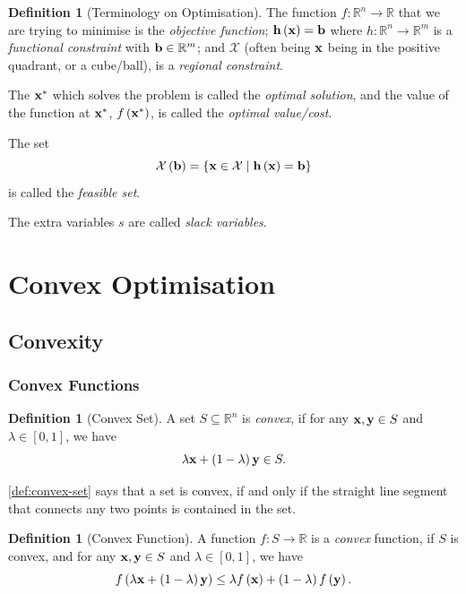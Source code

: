 \documentclass[11pt]{article}
\theoremstyle{definition}
\newtheorem{definition}[theorem]{Definition}
\theoremstyle{remark}
\newcommand{\pqty}[1]{\left(#1\right)}
\newcommand{\set}[2]{\left\{#1\mid #2\right\}}
\newcommand{\ccintv}[2]{[#1,#2]}
\newcommand{\functiondomain}[3]{#1:#2\to #3}
\newcommand{\RR}{\mathbb{R}}
\begin{document}
\begin{definition}[Terminology on Optimisation]\label{optim-unit-0002}
    \label{def:terminology}%
    The function \(\functiondomain{f}{\RR^n}{\RR}\) that we are trying to minimise is the \emph{objective function}; \(\vb{h}\pqty{\vb{x}} = \vb{b}\) where \(\functiondomain{h}{\RR^n}{\RR^m}\) is a \emph{functional constraint} with \(\vb{b} \in \RR^m\); and \(\mathcal{X}\) (often being \(\vb{x}\) being in the positive quadrant, or a cube/ball), is a \emph{regional constraint}.

    The \(\vb{x}^*\) which solves the problem is called the \emph{optimal solution}, and the value of the function at \(\vb{x}^*\), \(f\pqty{\vb{x}^*}\), is called the \emph{optimal value/cost}.

    The set
    \[
        \mathcal{X}\pqty{\vb{b}} = \set{\vb{x} \in \mathcal{X}}{\vb{h}\pqty{\vb{x}} = \vb{b}}
    \]
    is called the \emph{feasible set}.

    The extra variables \(s\) are called \emph{slack variables}.
\end{definition}


\section{Convex Optimisation}

\subsection{Convexity}

\subsubsection{Convex Functions}

\begin{definition}[Convex Set]\label{optim-unit-0003}
    \label{def:convex-set}%
    A set \(S \subseteq \RR^n\) is \emph{convex}, if for any \(\vb{x}, \vb{y} \in S\) and \(\lambda \in \ccintv{0}{1}\), we have
    \[
        \lambda \vb{x} + \pqty{1 - \lambda} \vb{y} \in S.
    \]
\end{definition}

\autoref{def:convex-set} says that a set is convex, if and only if the straight line segment that connects any two points is contained in the set.

\begin{definition}[Convex Function]\label{optim-unit-0004}
    \label{def:convex-fn}%
    A function \(\functiondomain{f}{S}{\RR}\) is a \emph{convex} function, if \(S\) is convex, and for any \(\vb{x}, \vb{y} \in S\) and \(\lambda \in \ccintv{0}{1}\), we have
    \[
        f\pqty{\lambda \vb{x} + \pqty{1 - \lambda} \vb{y}} \leq \lambda f\pqty{\vb{x}} + \pqty{1 - \lambda} f\pqty{\vb{y}}.
    \]  
\end{definition}
\end{document}
